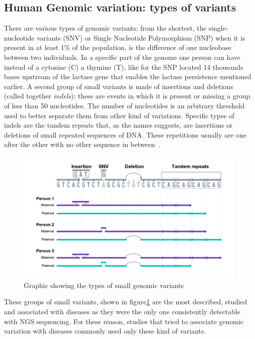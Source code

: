 \subsection{Human Genomic variation: types of variants}
There are various types of genomic variants: from the shortest, the single-nucleotide variants (SNV) or Single Nucleotide Polymorphism (SNP) when it is present in at least 1\% of the population, is the difference of one nucleobase between two individuals. In a specific part of the genome one person can have instead of a cytosine (C) a thymine (T), like for the SNP located 14 thousands bases upstream of the lactase gene that enables the lactase persistence mentioned earlier\cite{lactase_persistance}.
A second group of small variants is made of insertions and deletions (called together \emph{indels}): these are events in which it is present or missing a group of less than 50 nucleotides. The number of nucleotides is an arbitrary threshold used to better separate them from other kind of variations. Specific types of indels are the tandem repeats that, as the names suggests, are insertions or deletions of small repeated sequences of DNA. These repetitions usually are one after the other with no other sequence in between~\cite{nih_variation}.\\
\begin{figure}[h!]
	\centering
	\includegraphics[width=\linewidth]{figures/background/small_variants.png}
	\caption[Small genomic variants.]{Graphic showing the types of small genomic variants~\cite{nih_variation}}
	\label{fig:small_variants}
\end{figure}
These groups of small variants, shown in figure\ref{fig:small_variants} are the most described, studied and associated with diseases as they were the only one consistently detectable with NGS sequencing. For these reason, studies that tried to associate genomic variation with diseases commonly used only these kind of variants.\\
